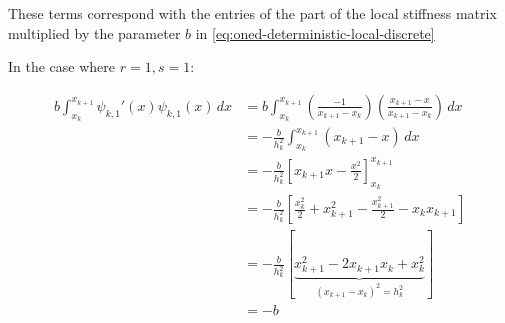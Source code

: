 These terms correspond with the entries of the part of the local stiffness matrix
multiplied by the parameter $b$ in \ref{eq:oned-deterministic-local-discrete}

In the case where $r = 1, s = 1$:

\begin{align*}
	b\int_{x_k}^{x_{k+1}}\psi_{k,1}'(x)\psi_{k,1}(x)\, dx
      &= b\int_{x_k}^{x_{k+1}}\left(\frac{-1}{x_{k+1} - x_k}\right)
                              \left(\frac{x_{k+1} - x}{x_{k+1} - x_k}\right)\, dx \\
      &= -\frac{b}{h_k^2}\int_{x_k}^{x_{k+1}}(x_{k+1} - x)\, dx \\
      &= -\frac{b}{h_k^2}\left[x_{k+1}x - \frac{x^2}{2}\right]_{x_k}^{x_{k+1}} \\
      &= -\frac{b}{h_k^2}\left[\frac{x_k^2}{2} + x_{k+1}^2 -\frac{x_{k+1}^2}{2}
                               - x_kx_{k+1}\right] \\
      &= -\frac{b}{h_k^2}
            [\underbrace{x_{k+1}^2 - 2x_{k+1}x_k + x_k^2}_{(x_{k+1} - x_k)^2 = h_k^2}] \\
      &= -b
\end{align*}